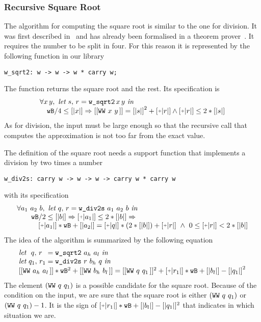 \subsubsection{Recursive Square Root}

The algorithm for computing the square root is similar to the one for division.
It was first described in~\cite{RecSqrt} and has already been formalised in a 
theorem prover~\cite{BerMagZim02}. It requires the number to be split
in four. For this reason it is represented by the following function in our
library
\begin{verbatim}
w_sqrt2: w -> w -> w * carry w;
\end{verbatim}
The function returns the square root and the rest.
Its specification is
$$\begin{array}{l}
\forall x\, y,\,\, \textit{let}\,\, s,\, r = \texttt{w\_sqrt2}\, x\, y\,\, \textit{in}\\
\hskip10pt \wB / 4 \le [|x|] \Rightarrow [[\WW x y]] = {[|s|]} ^ 2 + \ICP{r} \land \ICP{r} \le 2 * [|s|]
\end{array}
$$
As for division, the input must be large enough so that the recursive call
that computes the approximation is not too far from the exact value. 

The definition of the square root needs a support function that implements a division
by two times a number
\begin{verbatim}
w_div2s: carry w -> w -> w -> carry w * carry w
\end{verbatim}
with its specification
$$\begin{array}{l}
\forall a_1\,\, a_2\,\, b, \,\, \textit{let}\,\, q,\, r = \texttt{w\_div2s}\,\, a_1\,\, a_2\,\, b\,\, \textit{in}\\
\hskip20pt \wB / 2 \le [|b|] \Rightarrow \ICP{a_1} \le 2 * [|b|] \Rightarrow\\
\hskip30pt \ICP{a_1} * \wB + [|a_2|] = \ICP{q} *  (2 * [|b|]) + \ICP{r} \,\, \land\,\, 0 \le \ICP{r} < 2 * [|b|]
\end{array}
$$
The idea of the algorithm is summarized by the following equation
$$\begin{array}{l}
\textit{let}\,\,\,\, q ,\, r\,\,\, = \texttt{w\_sqrt2}\,\, {a_h}\,\, {a_l}\,\, \textit{in}\\
\textit{let}\,\, q_1 ,\, r_1 = \texttt{w\_div2s}\,\, r\,\, {b_h}\,\, q\,\, \textit{in}\\
{[[\WW {a_h} {a_l}]]} * \wB ^ 2 + [[\WW {b_h} {b_l}]] =
    [[\WW q {q_1}]] ^ 2 + \ICP{r_1} * \wB + [|{b_l}|] - {[|q_1|]} ^ 2 \\
\end{array}
$$
The element $(\texttt{WW}\,\,q\,\,q_1\,\!)$ is a possible candidate
for the square root. Because of the condition on
the input, we are sure that the square root is either $(\texttt{WW}\,\,q\,\,q_1\,\!)$ or
$(\texttt{WW}\,\,q\,\,q_1\,\!) - 1$. It is the sign of $\ICP{r_1} * \wB + 
[|{b_l}|] - [|q_1|] ^ 2$ that indicates in which situation we are. 